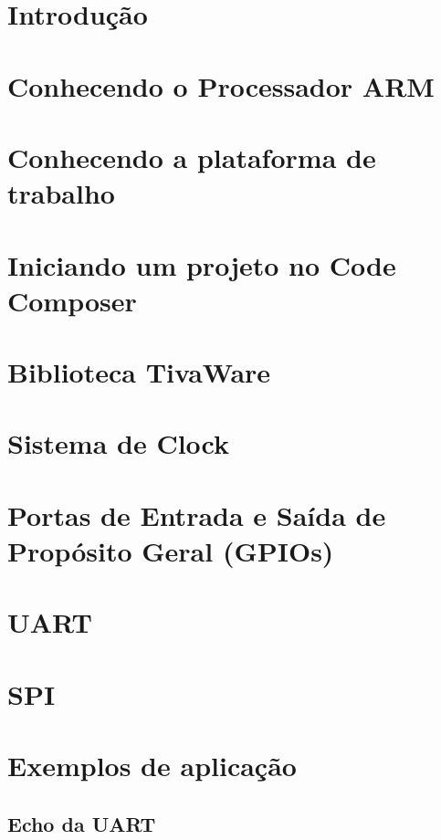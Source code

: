 \documentclass[a4paper,10pt]{book}
\begin{document}
\maketitle

\section{Introdução}


\section{Conhecendo o Processador ARM}


\section{Conhecendo a plataforma de trabalho}


\section{Iniciando um projeto no Code Composer}


\section{Biblioteca TivaWare}


\section{Sistema de Clock}


\section{Portas de Entrada e Saída de Propósito Geral (GPIOs)}


\section{UART}


\section{SPI}


\section{Exemplos de aplicação}

\subsection{Echo da UART}





\end{document}
